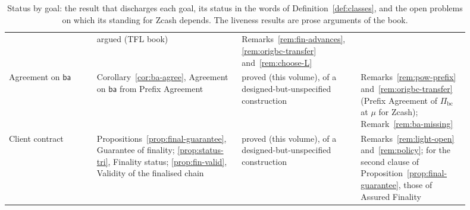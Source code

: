 \documentclass[11pt,a4paper]{article}
\theoremstyle{definition}
\newcommand{\bc}{\mathrm{bc}}
\newcommand{\Pibc}{\Pi_{\bc}}
\newcommand{\ba}{\mathsf{ba}}
\begin{document}
\begin{table}[tbp]
\begin{tabular}{@{}p{0.17\linewidth}p{0.29\linewidth}p{0.23\linewidth}
  p{0.21\linewidth}@{}}
  & argued (TFL book)
  & Remarks~\ref{rem:fin-advances}, \ref{rem:origbc-transfer}
  and~\ref{rem:choose-L} \\
\addlinespace
Agreement on $\ba$
  & Corollary~\ref{cor:ba-agree}, Agreement on $\ba$ from Prefix Agreement
  & proved (this volume), of a designed-but-unspecified construction
  & Remarks~\ref{rem:pow-prefix} and~\ref{rem:origbc-transfer} (Prefix
  Agreement of $\Pibc$ at $\mu$ for Zcash); Remark~\ref{rem:ba-missing} \\
\addlinespace
Client contract
  & Propositions~\ref{prop:final-guarantee}, Guarantee of finality;
  \ref{prop:status-tri}, Finality status; \ref{prop:fin-valid}, Validity of
  the finalised chain
  & proved (this volume), of a designed-but-unspecified construction
  & Remarks~\ref{rem:light-open} and~\ref{rem:policy}; for the second
  clause of Proposition~\ref{prop:final-guarantee}, those of Assured
  Finality \\
\bottomrule
\end{tabular}
\caption{Status by goal: the result that discharges each goal, its status
in the words of Definition~\ref{def:classes}, and the open problems on which
its standing for Zcash depends. The liveness results are prose arguments of
the book.}
\label{tab:goal-status}
\end{table}
\end{document}
